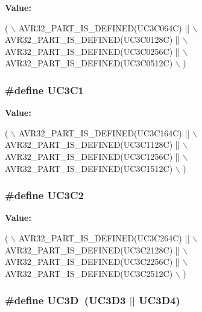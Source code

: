 {\bfseries Value\-:}
\begin{DoxyCode}
(   \(\backslash\)
        AVR32\_PART\_IS\_DEFINED(UC3C064C)  || \(\backslash\)
        AVR32\_PART\_IS\_DEFINED(UC3C0128C) || \(\backslash\)
        AVR32\_PART\_IS\_DEFINED(UC3C0256C) || \(\backslash\)
        AVR32\_PART\_IS\_DEFINED(UC3C0512C) \(\backslash\)
        )
\end{DoxyCode}
\hypertarget{group__uc3__part__macros__group_ga775cb0ff401f59a6062a4513ce6a65e6}{
\subsubsection[{U\-C3\-C1}]{\setlength{\rightskip}{0pt plus 5cm}\#define U\-C3\-C1}}\label{group__uc3__part__macros__group_ga775cb0ff401f59a6062a4513ce6a65e6}
{\bfseries Value\-:}
\begin{DoxyCode}
(   \(\backslash\)
        AVR32\_PART\_IS\_DEFINED(UC3C164C)  || \(\backslash\)
        AVR32\_PART\_IS\_DEFINED(UC3C1128C) || \(\backslash\)
        AVR32\_PART\_IS\_DEFINED(UC3C1256C) || \(\backslash\)
        AVR32\_PART\_IS\_DEFINED(UC3C1512C) \(\backslash\)
        )
\end{DoxyCode}
\hypertarget{group__uc3__part__macros__group_ga74bddd178c8022709acca0ad80ff4db8}{
\subsubsection[{U\-C3\-C2}]{\setlength{\rightskip}{0pt plus 5cm}\#define U\-C3\-C2}}\label{group__uc3__part__macros__group_ga74bddd178c8022709acca0ad80ff4db8}
{\bfseries Value\-:}
\begin{DoxyCode}
(   \(\backslash\)
        AVR32\_PART\_IS\_DEFINED(UC3C264C)  || \(\backslash\)
        AVR32\_PART\_IS\_DEFINED(UC3C2128C) || \(\backslash\)
        AVR32\_PART\_IS\_DEFINED(UC3C2256C) || \(\backslash\)
        AVR32\_PART\_IS\_DEFINED(UC3C2512C) \(\backslash\)
        )
\end{DoxyCode}
\hypertarget{group__uc3__part__macros__group_ga351a876f40669641e6ba9620909143d3}{
\subsubsection[{U\-C3\-D}]{\setlength{\rightskip}{0pt plus 5cm}\#define U\-C3\-D~({\bf U\-C3\-D3} $|$$|$ {\bf U\-C3\-D4})}}\label{group__uc3__part__macros__group_ga351a876f40669641e6ba9620909143d3}
